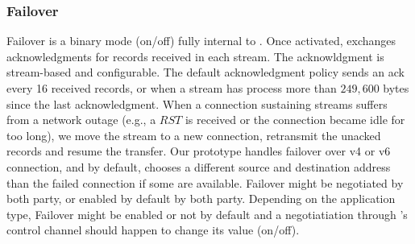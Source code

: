 \subsubsection{Failover}\label{failover}
Failover is a binary mode (on/off) fully internal to \tcpls. Once activated,
\tcpls exchanges acknowledgments for records received in each stream. The
acknowldgment is stream-based and configurable. The default acknowledgment
policy sends an ack every 16 received records, or when a stream has process more
than $249,600$ bytes since the last acknowledgment.  When a \tcp connection
sustaining \tcpls streams suffers from a network outage (e.g., a $RST$ is
received or the connection became idle for too long), we move the stream to a
new \tcp connection, retransmit the unacked records and resume the transfer. Our
prototype handles failover over v4 or v6 \tcp connection, and by default,
chooses a different source and destination address than the failed \tcp
connection if some are available. Failover might be negotiated by both party, or
enabled by default by both party. Depending on the application type, Failover
might be enabled or not by default and a negotiatiation through \tcpls's control
channel should happen to change its value (on/off).





